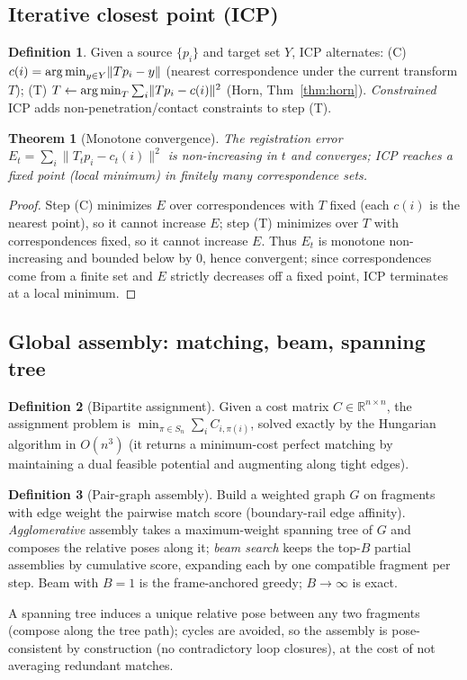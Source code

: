 \documentclass[11pt]{article}
\theoremstyle{definition}\newtheorem{definition}{Definition}[section]
\theoremstyle{plain}\newtheorem{theorem}{Theorem}[section]
\newcommand{\R}{\mathbb{R}}\newcommand{\Z}{\mathbb{Z}}\newcommand{\Norm}[1]{\lVert #1\rVert}
\begin{document}
\subsection{Iterative closest point (ICP)}
\begin{definition}
Given a source $\{p_i\}$ and target set $Y$, ICP alternates: (C) $c(i)=\argmin_{y\in Y}\Norm{T p_i-y}$
(nearest correspondence under the current transform $T$); (T) $T\leftarrow\argmin_{T}\sum_i\Norm{Tp_i-c(i)}^2$
(Horn, Thm~\ref{thm:horn}). \emph{Constrained} ICP adds non-penetration/contact constraints to step (T).
\end{definition}
\begin{theorem}[Monotone convergence]
The registration error $E_t=\sum_i\Norm{T_t p_i-c_t(i)}^2$ is non-increasing in $t$ and converges; ICP
reaches a fixed point (local minimum) in finitely many correspondence sets.
\end{theorem}
\begin{proof}
Step (C) minimizes $E$ over correspondences with $T$ fixed (each $c(i)$ is the nearest point), so it cannot
increase $E$; step (T) minimizes over $T$ with correspondences fixed, so it cannot increase $E$. Thus $E_t$ is
monotone non-increasing and bounded below by $0$, hence convergent; since correspondences come from a finite
set and $E$ strictly decreases off a fixed point, ICP terminates at a local minimum.
\end{proof}

\subsection{Global assembly: matching, beam, spanning tree}
\begin{definition}[Bipartite assignment]
Given a cost matrix $C\in\R^{n\times n}$, the assignment problem is
$\min_{\pi\in S_n}\sum_i C_{i,\pi(i)}$, solved exactly by the Hungarian algorithm in $O(n^3)$ (it returns a
minimum-cost perfect matching by maintaining a dual feasible potential and augmenting along tight edges).
\end{definition}
\begin{definition}[Pair-graph assembly]
Build a weighted graph $G$ on fragments with edge weight the pairwise match score (boundary-rail edge
affinity). \emph{Agglomerative} assembly takes a maximum-weight spanning tree of $G$ and composes the
relative poses along it; \emph{beam search} keeps the top-$B$ partial assemblies by cumulative score, expanding
each by one compatible fragment per step. Beam with $B=1$ is the frame-anchored greedy; $B\to\infty$ is exact.
\end{definition}
\begin{proposition}
A spanning tree induces a unique relative pose between any two fragments (compose along the tree path); cycles
are avoided, so the assembly is pose-consistent by construction (no contradictory loop closures), at the cost
of not averaging redundant matches.
\end{proposition}
\end{document}
